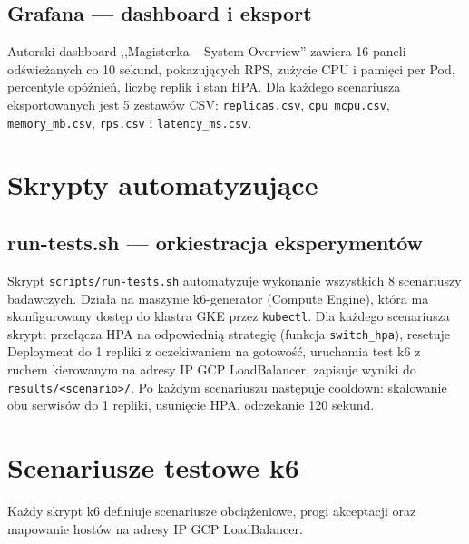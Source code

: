 \subsection{Grafana --- dashboard i eksport}

Autorski dashboard ,,Magisterka -- System Overview'' zawiera 16 paneli odświeżanych co 10 sekund, pokazujących RPS, zużycie CPU i pamięci per Pod, percentyle opóźnień, liczbę replik i stan HPA. Dla każdego scenariusza eksportowanych jest 5 zestawów CSV: \texttt{replicas.csv}, \texttt{cpu\_mcpu.csv}, \texttt{memory\_mb.csv}, \texttt{rps.csv} i \texttt{latency\_ms.csv}.

\section{Skrypty automatyzujące}

\subsection{run-tests.sh --- orkiestracja eksperymentów}

Skrypt \texttt{scripts/run-tests.sh} automatyzuje wykonanie wszystkich 8 scenariuszy badawczych. Działa na maszynie k6-generator (Compute Engine), która ma skonfigurowany dostęp do klastra GKE przez \texttt{kubectl}. Dla każdego scenariusza skrypt: przełącza HPA na odpowiednią strategię (funkcja \texttt{switch\_hpa}), resetuje Deployment do 1 repliki z oczekiwaniem na gotowość, uruchamia test k6 z ruchem kierowanym na adresy IP GCP LoadBalancer, zapisuje wyniki do \texttt{results/<scenario>/}. Po każdym scenariuszu następuje cooldown: skalowanie obu serwisów do 1 repliki, usunięcie HPA, odczekanie 120 sekund.





\section{Scenariusze testowe k6}

Każdy skrypt k6 definiuje scenariusze obciążeniowe, progi akceptacji oraz mapowanie hostów na adresy IP GCP LoadBalancer.

